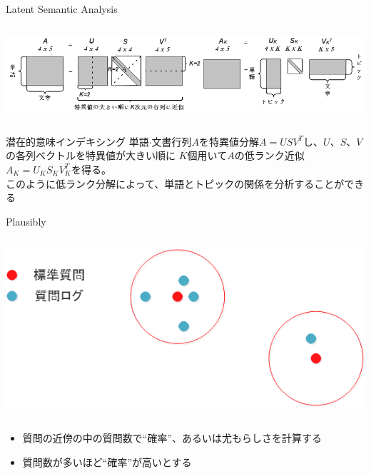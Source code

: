 \documentclass[14pt,xcolor=dvipsnames,table,dvipdfmx]{beamer}
\begin{document}
\begin{frame}{Latent Semantic Analysis}
    \begin{columns}[c]
        \begin{column}{1.0\textwidth} %
            \includegraphics[width=\columnwidth]{photo11.png}
		\end{column}
    \end{columns}
	\begin{block}{潜在的意味インデキシング}
	\fontsize{12pt}{7.2}\selectfont
		単語$\cdot$文書行列$A$を特異値分解$A = USV^T$し、$U$、$S$、$V$	の各列ベクトルを特異値が大きい順に
		$K$個用いて$A$の低ランク近似$A_K=U_KS_KV_{K}^T$を得る。 \\
		このように低ランク分解によって、単語とトピックの関係を分析することができる
	\end{block}
\end{frame}

\begin{frame}{Plausibly}
	\begin{columns}[t]
		\begin{column}{0.8\textwidth} %
			\includegraphics[width=\columnwidth]{photo12.png}
		\end{column}
	\end{columns}
	\begin{block}{} 
		\begin{itemize}
			\item 質問の近傍の中の質問数で“確率”、あるいは尤もらしさを計算する
			\item 質問数が多いほど“確率”が高いとする
		\end{itemize}
	\end{block}
\end{frame}
\end{document}
